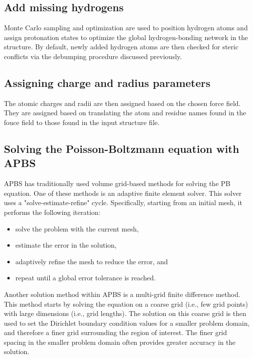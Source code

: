 \documentclass[journal=jpcbfk, manuscript=article]{achemso}
\begin{document}
\subsection{Add missing hydrogens}
Monte Carlo sampling and optimization are used to position hydrogen atoms and assign protonation states to optimize the global hydrogen-bonding network in the structure. By default, newly added hydrogen atoms are then checked for steric conflicts via the debumping procedure discussed previously.

\subsection{Assigning charge and radius parameters}
The atomic charges and radii are then assigned based on the chosen force field. They are assigned based on translating the atom and residue names found in the fouce field to those found in the input structure file. 

\subsection{Solving the Poisson-Boltzmann equation with APBS}
APBS has traditionally used volume grid-based methods for solving the PB equation. One of these methods is an adaptive finite element solver. This solver uses a "solve-estimate-refine" cycle. Specifically, starting from an initial mesh, it performs the following iteration:
%
\begin{itemize}
	\itemsep-0.25em
	\item solve the problem with the current mesh,
	\item estimate the error in the solution,
	\item adaptively refine the mesh to reduce the error, and
	\item repeat until a global error tolerance is reached.
\end{itemize}
%

Another solution method within APBS is a multi-grid finite difference method. This method starts by solving the equation on a coarse grid (i.e., few grid points) with large dimensions (i.e., grid lengths). The solution on this coarse grid is then used to set the Dirichlet boundary condition values for a smaller problem domain, and therefore a finer grid surrounding the region of interest. The finer grid spacing in the smaller problem domain often provides greater accuracy in the solution.
\end{document}
